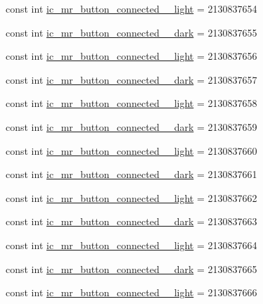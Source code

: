 \begin{CompactItemize}
\item 
const int \hyperlink{class__2doo_1_1_droid_1_1_resource_1_1_drawable_49b51fdbb354b3821ff7dd5e0a827636}{ic\_\-mr\_\-button\_\-connected\_\_\-light} = 2130837654
\item 
const int \hyperlink{class__2doo_1_1_droid_1_1_resource_1_1_drawable_438e770eb5f140c2f5e734cfa21bffc8}{ic\_\-mr\_\-button\_\-connected\_\_\-dark} = 2130837655
\item 
const int \hyperlink{class__2doo_1_1_droid_1_1_resource_1_1_drawable_75a958d8d7430e1e8d334a56eb6497a2}{ic\_\-mr\_\-button\_\-connected\_\_\-light} = 2130837656
\item 
const int \hyperlink{class__2doo_1_1_droid_1_1_resource_1_1_drawable_513ddbaf44ef05ba0af08f2c71c1120f}{ic\_\-mr\_\-button\_\-connected\_\_\-dark} = 2130837657
\item 
const int \hyperlink{class__2doo_1_1_droid_1_1_resource_1_1_drawable_4bb5c2929eabc223feaebf5945a8c7b8}{ic\_\-mr\_\-button\_\-connected\_\_\-light} = 2130837658
\item 
const int \hyperlink{class__2doo_1_1_droid_1_1_resource_1_1_drawable_4c3ec91f5b13f267281828af0d6eec61}{ic\_\-mr\_\-button\_\-connected\_\_\-dark} = 2130837659
\item 
const int \hyperlink{class__2doo_1_1_droid_1_1_resource_1_1_drawable_2b39fbfbebef375eea50f30a53e29579}{ic\_\-mr\_\-button\_\-connected\_\_\-light} = 2130837660
\item 
const int \hyperlink{class__2doo_1_1_droid_1_1_resource_1_1_drawable_370cd94c4fe649817a93231f85758ee4}{ic\_\-mr\_\-button\_\-connected\_\_\-dark} = 2130837661
\item 
const int \hyperlink{class__2doo_1_1_droid_1_1_resource_1_1_drawable_1d3b39f73b4411ac3a9baeb0bb2635b2}{ic\_\-mr\_\-button\_\-connected\_\_\-light} = 2130837662
\item 
const int \hyperlink{class__2doo_1_1_droid_1_1_resource_1_1_drawable_e163db67a074b47506f98064d9d67cbc}{ic\_\-mr\_\-button\_\-connected\_\_\-dark} = 2130837663
\item 
const int \hyperlink{class__2doo_1_1_droid_1_1_resource_1_1_drawable_6bb84bfcab6dd5ce77814e5f9a40a573}{ic\_\-mr\_\-button\_\-connected\_\_\-light} = 2130837664
\item 
const int \hyperlink{class__2doo_1_1_droid_1_1_resource_1_1_drawable_79e9bff7e7b7cefad19d3610e165bf81}{ic\_\-mr\_\-button\_\-connected\_\_\-dark} = 2130837665
\item 
const int \hyperlink{class__2doo_1_1_droid_1_1_resource_1_1_drawable_34511ab009ee01b311ee879f70e97919}{ic\_\-mr\_\-button\_\-connected\_\_\-light} = 2130837666

\end{CompactItemize}
